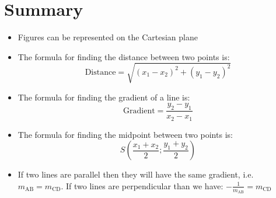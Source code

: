 %     
%     
%     
  \label{m39167*fs-id5760712}
            \section{ Summary }
            \nopagebreak
\label{m39167*fs-id1165371842904}
\label{m39167*eip-966}\begin{itemize}[noitemsep]
            \item Figures can be represented on the Cartesian plane\item The formula for finding the distance between two points is: \label{m39167*eid9734}\nopagebreak\noindent{}
    \begin{equation}
    \mathrm{Distance}=\sqrt{{\left({x}_{1}-{x}_{2}\right)}^{2}+{\left({y}_{1}-{y}_{2}\right)}^{2}}\tag{15.11}
      \end{equation}
    \item The formula for finding the gradient of a line is: \label{m39167*edi6342}\nopagebreak\noindent{}
    \begin{equation}
    \mathrm{Gradient}=\frac{{y}_{2}-{y}_{1}}{{x}_{2}-{x}_{1}}\tag{15.12}
      \end{equation}
    \item The formula for finding the midpoint between two points is: \label{m39167*eid6743}\nopagebreak\noindent{}
    \begin{equation}
    S\left(\frac{{x}_{1}+{x}_{2}}{2};\frac{{y}_{1}+{y}_{2}}{2}\right)\tag{15.13}
      \end{equation}
\item  If two lines are parallel then they will have the same gradient, i.e. ${m}_{\mathrm{AB}}={m}_{\mathrm{CD}}$. If two lines are perpendicular than we have: $-\frac{1}{{m}_{\mathrm{AB}}}={m}_{\mathrm{CD}}$\end{itemize}
\par 
\label{m39167*secfhsst!!!underscore!!!id2370}

